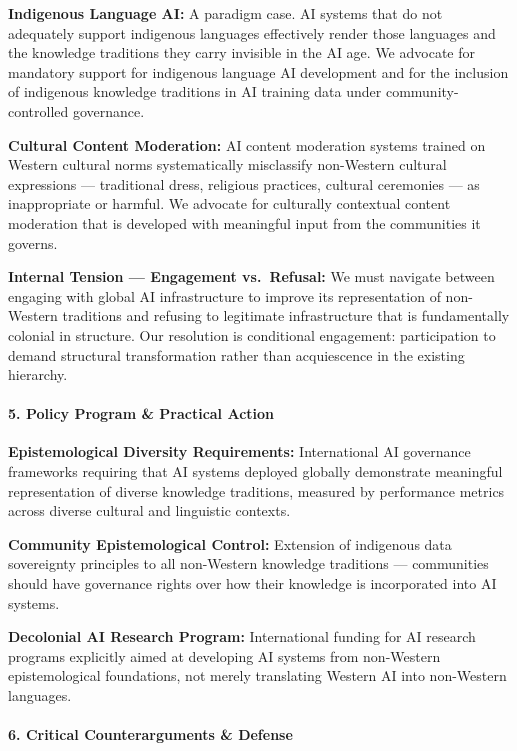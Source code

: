 \textbf{Indigenous Language AI:} A paradigm case. AI systems that do not
adequately support indigenous languages effectively render those
languages and the knowledge traditions they carry invisible in the AI
age. We advocate for mandatory support for indigenous language AI
development and for the inclusion of indigenous knowledge traditions in
AI training data under community-controlled governance.

\textbf{Cultural Content Moderation:} AI content moderation systems
trained on Western cultural norms systematically misclassify non-Western
cultural expressions --- traditional dress, religious practices,
cultural ceremonies --- as inappropriate or harmful. We advocate for
culturally contextual content moderation that is developed with
meaningful input from the communities it governs.

\textbf{Internal Tension --- Engagement vs.~Refusal:} We must navigate
between engaging with global AI infrastructure to improve its
representation of non-Western traditions and refusing to legitimate
infrastructure that is fundamentally colonial in structure. Our
resolution is conditional engagement: participation to demand structural
transformation rather than acquiescence in the existing hierarchy.

\paragraph{5. Policy Program \& Practical
Action}\label{policy-program-practical-action-47}

\textbf{Epistemological Diversity Requirements:} International AI
governance frameworks requiring that AI systems deployed globally
demonstrate meaningful representation of diverse knowledge traditions,
measured by performance metrics across diverse cultural and linguistic
contexts.

\textbf{Community Epistemological Control:} Extension of indigenous data
sovereignty principles to all non-Western knowledge traditions ---
communities should have governance rights over how their knowledge is
incorporated into AI systems.

\textbf{Decolonial AI Research Program:} International funding for AI
research programs explicitly aimed at developing AI systems from
non-Western epistemological foundations, not merely translating Western
AI into non-Western languages.

\paragraph{6. Critical Counterarguments \&
Defense}\label{critical-counterarguments-defense-47}

